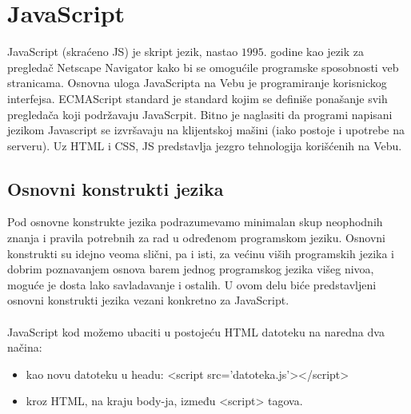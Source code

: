 \section{JavaScript}
\label{sec:javascript}

JavaScript (skraćeno JS) je skript jezik, nastao $1995$. godine kao jezik za pregledač Netscape Navigator kako bi se omogućile programske sposobnosti veb stranicama. Osnovna uloga JavaScripta na Vebu je programiranje korisnickog interfejsa. ECMAScript standard je standard kojim se definiše ponašanje svih pregledača koji podržavaju JavaScrpit. Bitno je naglasiti da programi napisani jezikom Javascript se izvršavaju na klijentskoj mašini (iako postoje i upotrebe na serveru). Uz HTML i CSS, JS predstavlja jezgro tehnologija korišćenih na Vebu.

\subsection{Osnovni konstrukti jezika}
Pod osnovne konstrukte jezika podrazumevamo minimalan skup neophodnih znanja i pravila potrebnih za rad u određenom programskom jeziku. Osnovni konstrukti su idejno veoma slični, pa i isti, za većinu viših programskih jezika i dobrim poznavanjem osnova barem jednog programskog jezika višeg nivoa, moguće je dosta lako savladavanje i ostalih. U ovom delu biće predstavljeni osnovni konstrukti jezika vezani konkretno za JavaScript.\\\\
JavaScript kod možemo ubaciti u postojeću HTML datoteku na naredna dva načina:
\begin{itemize}
    \item kao novu datoteku u headu: <script src='datoteka.js'></script> 
    \item kroz HTML, na kraju body-ja, između <script> tagova.
\end{itemize}

